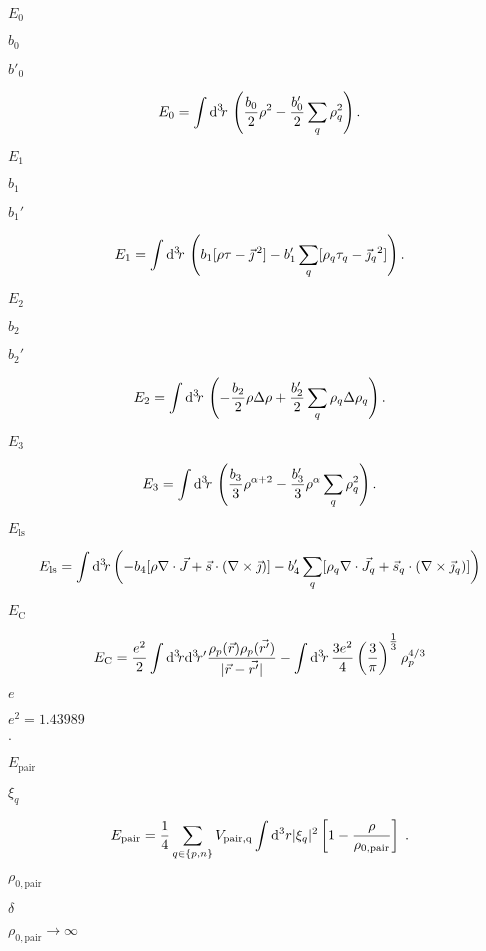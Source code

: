 \documentclass{article}
\begin{document}
$ E_0 $
\pagebreak

$ b_0 $
\pagebreak

$ b'_0 $
\pagebreak

\[ E_0=\int {\mathrm d}^3\!r\,\left(\frac{b_0}{2}\rho^2-\frac{b_0'}{2}\sum_q\rho_q^2\right). \]
\pagebreak

$ E_{1}$
\pagebreak

$ b_1 $
\pagebreak

$ b_1' $
\pagebreak

\[ E_1=\int {\mathrm d}^3\!r\,\left(b_1[\rho\tau-{\vec\jmath\,}{}^2] -b_1'\sum_q[\rho_q\tau_q-{\vec\jmath_q}{}^2]\right).\]
\pagebreak

$ E_{2} $
\pagebreak

$ b_2 $
\pagebreak

$ b_2' $
\pagebreak

\[ E_2=\int {\mathrm d}^3\!r\,\left(-\frac{b_2}{2}\rho\Delta\rho +\frac{b_2'}{2}\sum_q\rho_q\Delta\rho_q\right). \]
\pagebreak

$ E_{3} $
\pagebreak

\[ E_{3}=\int {\mathrm d}^3\!r\,\left(\frac{b_3}{3}\rho^{\alpha+2} -\frac{b_3'}{3}\rho^\alpha\sum_q\rho_q^2\right). \]
\pagebreak

$ E_\mathrm{ls} $
\pagebreak

\[ E_\mathrm{ls}=\int {\mathrm d}^3\!r\,\biggl( -b_4[\rho\nabla\cdot\vec J+ \vec s\cdot(\nabla\times\vec\jmath)]-b_4'\sum_q[\rho_q\nabla\cdot\vec J_q+ \vec s_q\cdot(\nabla\times\vec\jmath_q)]\biggr) \]
\pagebreak

$ E_\mathrm{C} $
\pagebreak

\[ E_\mathrm{C} = \frac{e^2}{2}\int {\mathrm d}^3\!r {\mathrm d}^3\!r' \frac{\rho_p(\vec{r})\rho_p(\vec{r'})}{|\vec{r}-\vec{r'}|} -\int {\mathrm d}^3\!r\,\frac{3e^2}{4}\left(\frac3{\pi}\right)^{\tfrac1{3}}\rho_p^{4/3} \]
\pagebreak

$ e $
\pagebreak

$ e^2=1.43989 $
\pagebreak

$ \cdot $
\pagebreak

$ E_\mathrm{pair} $
\pagebreak

$ \xi_q $
\pagebreak

\[ E_{\rm pair} = \frac{1}{4} \sum_{q\in\{p,n\}}V_\mathrm{pair,q} \int {\mathrm d}^3r |\xi_q|^2 \left[1 -\frac{\rho}{\rho_{0,\mathrm{pair}}}\right]\;. \]
\pagebreak

$ \rho_{0,\mathrm{pair}} $
\pagebreak

$ \delta $
\pagebreak

$ \rho_{0,\mathrm{pair}}\longrightarrow\infty $
\pagebreak
\end{document}
